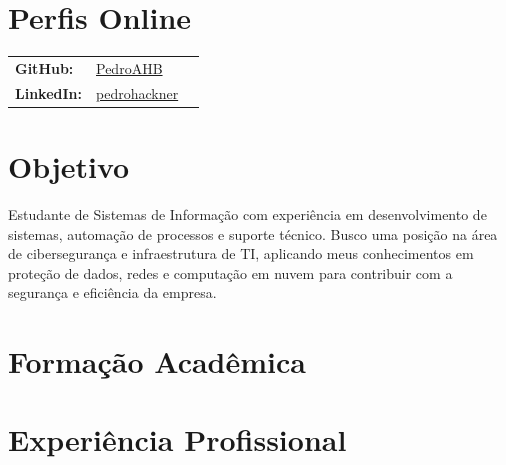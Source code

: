 \documentclass[11pt,a4paper]{moderncv} %
\begin{document}
\maketitle %


\section{Perfis Online}
\begin{tabular}{@{}lll}
    \textbf{GitHub:} & \hspace{0.75cm}\href{https://github.com/PedroAHB}{PedroAHB} & \\
    \textbf{LinkedIn:} & \hspace{0.75cm}\href{https://www.linkedin.com/in/pedrohackner/}{pedrohackner} & \\
\end{tabular}


\section{Objetivo}

\justify Estudante de Sistemas de Informação com experiência em desenvolvimento de sistemas, automação de processos e suporte técnico. Busco uma posição na área de cibersegurança e infraestrutura de TI, aplicando meus conhecimentos em proteção de dados, redes e computação em nuvem para contribuir com a segurança e eficiência da empresa.


\section{Formação Acadêmica}


\section{Experiência Profissional}

\end{document}
